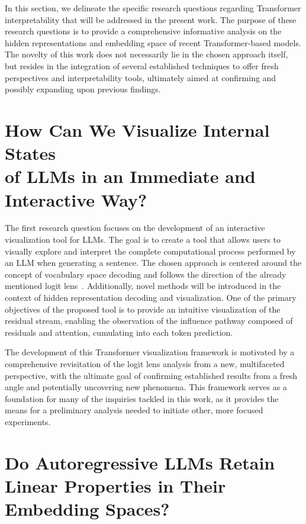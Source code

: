 In this section, we delineate the specific research questions regarding Transformer interpretability that will be addressed in the present work.
The purpose of these research questions is to provide a comprehensive informative analysis on the hidden representations and embedding space of recent Transformer-based models.
The novelty of this work does not necessarily lie in the chosen approach itself, but resides in the integration of several established techniques to offer fresh perspectives and interpretability tools, ultimately aimed at confirming and possibly expanding upon previous findings.

\section[How Can We Visualize Internal States of LLMs in an Immediate and Interactive Way?]{How Can We Visualize Internal States \texorpdfstring{ \\ }{} of LLMs in an Immediate and \texorpdfstring{ \\ }{} Interactive Way?}\label{sec:rq_intravisto}

The first research question focuses on the development of an interactive visualization tool for LLMs.
The goal is to create a tool that allows users to visually explore and interpret the complete computational process performed by an LLM when generating a sentence.
The chosen approach is centered around the concept of vocabulary space decoding and follows the direction of the already mentioned logit lens~\cite{nostalgebraist2020}.
Additionally, novel methods will be introduced in the context of hidden representation decoding and visualization.
One of the primary objectives of the proposed tool is to provide an intuitive visualization of the residual stream, enabling the observation of the influence pathway composed of residuals and attention, cumulating into each token prediction.

The development of this Transformer visualization framework is motivated by a comprehensive revisitation of the logit lens analysis from a new, multifaceted perspective, with the ultimate goal of confirming established results from a fresh angle and potentially uncovering new phenomena.
This framework serves as a foundation for many of the inquiries tackled in this work, as it provides the means for a preliminary analysis needed to initiate other, more focused experiments.

\section{Do Autoregressive LLMs Retain Linear Properties in Their Embedding Spaces?}\label{sec:rq_embeddings}

